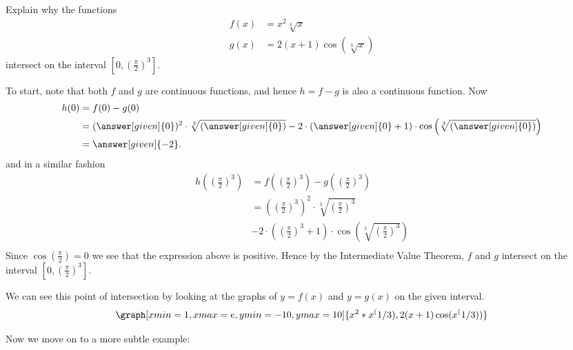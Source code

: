 \documentclass{ximera}
\begin{document}
\begin{example} 
  Explain why the functions
  \begin{align*}
    f(x) &= x^2\sqrt[3]{x}\\
    g(x) &= 2(x+1)\cos(\sqrt[3]{x})
  \end{align*}
  intersect on the interval $\left[0,\left( \frac{\pi}{2}\right)^3 \right]$.

  To start, note that both $f$ and $g$ are continuous functions, and
  hence $h = f-g$ is also a continuous function. Now
  \begin{align*}
    h(0) &= f(0) - g(0) \\
    &= (\answer[given]{0})^2\cdot \sqrt[3]{(\answer[given]{0})} - 2\cdot(\answer[given]{0}+1) \cdot \cos\left(\sqrt[3]{(\answer[given]{0})} \right)\\
    &= \answer[given]{-2}.
  \end{align*}
  and in a similar fashion
   \begin{align*}
    h\left(\left( \frac{\pi}{2}\right)^3\right) &= f\left(\left( \frac{\pi}{2}\right)^3\right) - g\left(\left( \frac{\pi}{2}\right)^3\right) \\
         &= \left( \left( \frac{\pi}{2}\right)^3\right)^2\cdot \sqrt[3]{\left( \frac{\pi}{2}\right)^3} \\ 
         & -  2\cdot\left( \left( \frac{\pi}{2}\right)^3+1\right) \cdot \cos\left(\sqrt[3]{\left( \frac{\pi}{2}\right)^3} \right)\\
   \end{align*}
   Since $\cos\left( \frac{\pi}{2}\right)=0$ we see that the expression above is
   positive. Hence by the Intermediate Value Theorem, $f$ and $g$
   intersect on the interval $\left[0,\left( \frac{\pi}{2}\right)^3 \right]$.
   \begin{onlineOnly}
   We can see this point of intersection by looking at the graphs of $y=f(x)$ and $y=g(x)$ on the given interval. 
   \[
   \graph[xmin=1,xmax=e,ymin=-10,ymax=10]{x^2 *x^(1/3), 2(x+1)\cos(x^(1/3))}
   \]
   \end{onlineOnly}
\end{example}




Now we move on to a more subtle example:
\end{document}

